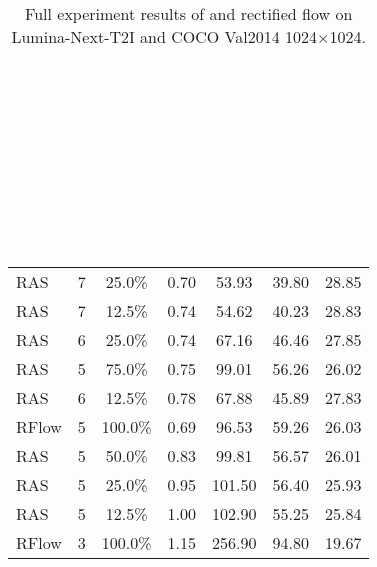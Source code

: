 \begin{table*}[hb]
\begin{tabular}{lcccccc}
RAS & 7 & 25.0\% & 0.70 & 53.93 & 39.80 & 28.85 \\
RAS & 7 & 12.5\% & 0.74 & 54.62 & 40.23 & 28.83 \\
RAS & 6 & 25.0\% & 0.74 & 67.16 & 46.46 & 27.85 \\
RAS & 5 & 75.0\% & 0.75 & 99.01 & 56.26 & 26.02 \\
RAS & 6 & 12.5\% & 0.78 & 67.88 & 45.89 & 27.83 \\
\rowcolor{gray!10} RFlow & 5 & 100.0\% & 0.69 & 96.53 & 59.26 & 26.03 \\
RAS & 5 & 50.0\% & 0.83 & 99.81 & 56.57 & 26.01 \\
RAS & 5 & 25.0\% & 0.95 & 101.50 & 56.40 & 25.93 \\
RAS & 5 & 12.5\% & 1.00 & 102.90 & 55.25 & 25.84 \\

\rowcolor{gray!10} RFlow & 3 & 100.0\% & 1.15 & 256.90 & 94.80 & 19.67 \\
\hline
\end{tabular}
\caption{Full experiment results of \ourmethod{} and rectified flow on Lumina-Next-T2I and COCO Val2014 1024$\times$1024.\\~\\~\\~\\~\\~\\~\\~\\~\\~\\}

\label{tab:lumina_app}
\end{table*}



